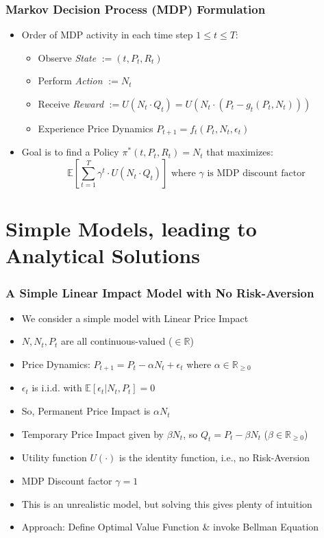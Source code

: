 \documentclass[handout]{beamer}
\begin{document}
\begin{frame}
\frametitle{Markov Decision Process (MDP) Formulation}
\pause
\begin{itemize}[<+->]
\item Order of MDP activity in each time step $1 \leq t \leq T$:
\begin{itemize}
\item Observe {\em State} $:= (t, P_t, R_t)$
\item Perform {\em Action} $:= N_t$
\item Receive {\em Reward} $:= U(N_t \cdot Q_t) = U(N_t \cdot (P_t - g_t(P_t, N_t)))$
\item Experience Price Dynamics $P_{t+1} = f_t(P_t, N_t, \epsilon_t)$
\end{itemize}
\item Goal is to find a Policy $\pi^*(t, P_t, R_t) = N_t$ that maximizes: $$\mathbb{E}[\sum_{t=1}^T \gamma^t \cdot U(N_t \cdot Q_t)] \mbox{ where } \gamma \mbox{ is MDP discount factor}$$
\end{itemize}
\end{frame}

\section{Simple Models, leading to Analytical Solutions}

\begin{frame}
\frametitle{A Simple Linear Impact Model with No Risk-Aversion}
\pause
\begin{itemize}[<+->]
\item We consider a simple model with Linear Price Impact
\item $N, N_t, P_t$ are all continuous-valued ($\in \mathbb{R}$)
\item Price Dynamics: $P_{t+1} = P_t - \alpha N_t + \epsilon_t$ where $\alpha \in \mathbb{R}_{\geq 0}$
\item $\epsilon_t$ is i.i.d. with $\mathbb{E}[\epsilon_t|N_t, P_t] = 0$
\item So, Permanent Price Impact is $\alpha N_t$
\item Temporary Price Impact given by $\beta N_t$, so $Q_t = P_t - \beta N_t$ ($\beta \in \mathbb{R}_{\geq 0}$)
\item Utility function $U(\cdot)$ is the identity function, i.e., no Risk-Aversion
\item MDP Discount factor $\gamma = 1$
\item This is an unrealistic model, but solving this gives plenty of intuition
\item Approach: Define Optimal Value Function \& invoke Bellman Equation
\end{itemize}
\end{frame}
\end{document}
